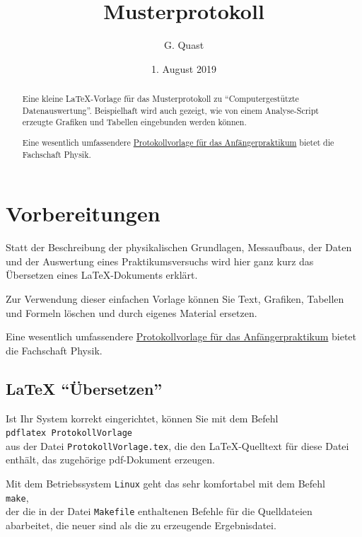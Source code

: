 \documentclass[a4paper,10pt]{article}
\title{Musterprotokoll}
\author{G. Quast}
\date{1. August 2019}
\begin{document}
\maketitle

\begin{abstract}
  Eine kleine \LaTeX-Vorlage für das Musterprotokoll zu
 "`Computergestützte Datenauswertung"'. Beispielhaft wird
 auch gezeigt, wie von einem Analyse-Script erzeugte
 Grafiken und Tabellen eingebunden werden können.

 Eine wesentlich umfassendere 
\href{http://fachschaft.physik.kit.edu/drupal/content/latex-vorlagen}
     {Protokollvorlage für das Anfängerpraktikum}
  bietet die Fachschaft Physik.
\end{abstract} 



\section{Vorbereitungen} %
\label{chap:intro}  %

Statt der Beschreibung der physikalischen Grundlagen, Messaufbaus,
der Daten und der Auswertung eines Praktikumsversuchs wird hier 
ganz kurz das Übersetzen eines \LaTeX{}-Dokuments erklärt.

Zur Verwendung dieser einfachen Vorlage können Sie 
Text, Grafiken, Tabellen und Formeln 
löschen und durch eigenes Material ersetzen.

  Eine wesentlich umfassendere
  \href{http://fachschaft.physik.kit.edu/drupal/content/latex-vorlagen}
  {Protokollvorlage für das Anfängerpraktikum} bietet die Fachschaft 
  Physik.


\subsection{\LaTeX{} "`Übersetzen"'}
Ist Ihr System korrekt eingerichtet, können Sie mit dem Befehl \\
\verb|pdflatex ProtokollVorlage|\\
aus der Datei \verb|ProtokollVorlage.tex|, die den \LaTeX{}-Quelltext
für diese Datei enthält, das zugehörige pdf-Dokument erzeugen. 

Mit dem Betriebssystem \verb|Linux| geht das sehr komfortabel 
mit dem Befehl \\
\verb|make|,\\
der die in der Datei \verb|Makefile| enthaltenen Befehle für
die Quelldateien abarbeitet, die neuer sind als die zu erzeugende
Ergebnisdatei. 
\end{document}
